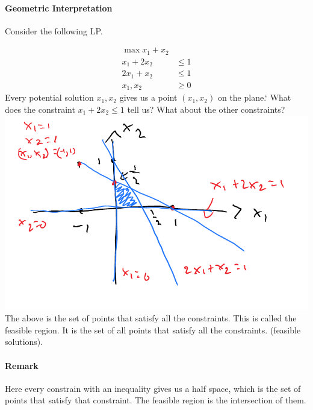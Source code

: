 \documentclass[12 pt]{article}
\begin{document}
        \paragraph{Geometric Interpretation} Consider the following
        LP.

        \begin{align*}
          \max x_1+x_2
          \\ x_1 + 2x_2  & \leq 1
          \\ 2x_1 + x_2 & \leq 1
          \\ x_1, x_2 & \geq 0
        \end{align*}
        Every potential solution $x_1, x_2$ gives us a point $(x_1,
        x_2)$ on the plane.`
        What does the constraint $x_1 + 2x_2 \leq 1$ tell us? What
        about the other constraints?
        \\ \includegraphics[width=.9\textwidth]{i100.pdf}
        The above is the set of points that satisfy all the
        constraints. This is called the feasible region. It is the set
        of all points that satisfy all the constraints. (feasible
        solutions).
        \paragraph{Remark} Here every constrain with an inequality
        gives us a half space, which is the set of points that satisfy
        that constraint. The feasible region is the intersection of them.
\end{document}
